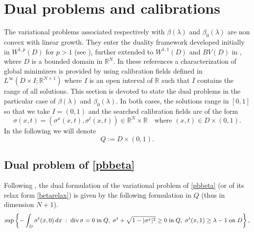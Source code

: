 \documentclass[reqno,11pt]{amsart}
\theoremstyle{definition}
\numberwithin{equation}{section}
\def\ov{\overline}
\DeclareMathOperator{\Div}{div}
\newcommand{\RR}{\mathbb{R}}
\def\R{\mathbb{R}}
\newcommand{\tinm}[1]{\text{\;#1\;}}
\newcommand{\1}{{{\bf 1}\kern-0,28em\rm l}}
\def\sepa{\; : \;}
\newcommand{\aco}[1]{\left\{#1\right\}}
\def\l{\lambda}
\begin{document}
%


\section{Dual problems and calibrations}
\label{secdual}

The variational problems associated respectively with $\beta(\lambda)$ and $\beta_0(\lambda)$ are non convex with linear growth. They enter the duality framework developed initially in $W^{1,p}(D)$ for $p>1$  (see \cite{boufra2018}), further extended to $W^{1,1}(D)$ and $BV(D)$  in \cite{bouphan2025}, where $D$ is a bounded domain in $\R^N$. In these references a characterization of global minimizers is provided by using calibration fields defined in $L^\infty(D\times I;\R^{N+1})$ 
 where $I$ is an open interval of $\R$ such that $\ov I$  contains the range of all solutions.  
 This section is devoted to state the dual problems in the particular case of $\beta(\l)$ and $\beta_0(\l)$. 
 In both cases,  the solutions range in $[0,1]$ so that we take $I=(0,1)$ and the searched calibration fields are  of the form
 $$ \sigma(x,t) =\left(\sigma^x(x,t), \sigma^t(x,t)\right) \in \R^N\times \R  \quad \text{where $(x,t)\in D\times (0,1)$} . $$
In the following we will denote  
$$   Q := D \times (0,1) .$$
 

 
\subsection{Dual problem of \eqref{pbbeta}}\label{dualb0}






Following \cite{boufra2018}, the dual formulation of  the variational problem of \eqref{pbbeta} (or of its relax form \eqref{betarelax}) is given by
the following formulation in $Q$ (thus in dimension $N+1$).
\begin{align}\label{dual-beta}
\sup \aco{ -\int_D \sigma^t(x,0)\, dx \sepa \Div\sigma =0 \tinm{in} Q,\; \sigma^t + \sqrt{1- |\sigma^x|^2} \ge 0 \tinm{in} Q,\; \sigma^t(x,1) \ge \lambda -1 \tinm{on} D},
\end{align}
\end{document}
